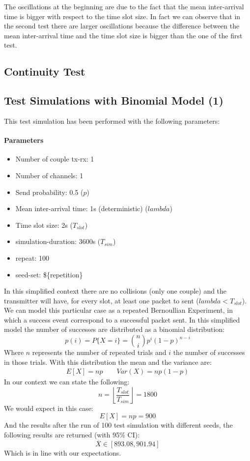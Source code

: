 \noindent The oscillations at the beginning are due to the fact that the mean inter-arrival time is bigger with respect to the time slot size. In fact we can observe that in the second test there are larger oscillations because the difference between the mean inter-arrival time and the time slot size is bigger than the one of the first test.
\subsection{Continuity Test}


\subsection{Test Simulations with Binomial Model (1)}
This test simulation has been performed with the following parameters:
\paragraph{Parameters}
\begin{itemize}
	\item Number of couple tx-rx: 1
	\item Number of channels: 1
	\item Send probability: 0.5 ($p$)
	\item Mean inter-arrival time: 1s (deterministic) ($lambda$)
	\item Time slot size: 2s ($T_{slot}$)
	\item simulation-duration: 3600s ($T_{sim}$)
	\item repeat: 100
	\item seed-set: \$\{repetition\}
\end{itemize}
In this simplified context there are no collisions (only one couple) and the transmitter will have, for every slot, at least one packet to sent ($lambda < T_{slot}$). We can model this particular case as a repeated Bernoullian Experiment, in which a success event correspond to a successful packet sent. In this simplified model the number of successes are distributed as a binomial distribution:
\begin{equation}
	p(i) = P\{X = i\} = \binom{n}{i} p^{i} (1-p)^{n-i}
\end{equation}
Where $n$ represents the number of repeated trials and $i$ the number of successes in those trials. With this distribution the mean and the variance are:
\begin{align*}
	E[X] = np \qquad     
	Var(X) = np(1-p)
\end{align*}
In our context we can state the following:
\begin{equation}
	n = \left \lfloor{\dfrac{T_{slot}}{T_{sim}}}\right \rfloor = 1800
\end{equation}
We would expect in this case:
\begin{equation}
	E[X] = np = 900
\end{equation}
And the results after the run of 100 test simulation with different seeds, the following results are returned (with 95\% CI):
\begin{equation}
	\overline{X} \in [893.08, 901.94]
\end{equation}
Which is in line with our expectations.

